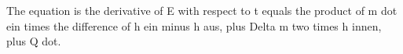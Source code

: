 The equation is the derivative of E with respect to t equals the product of m dot ein times the difference of h ein minus h aus, plus Delta m two times h innen, plus Q dot.
